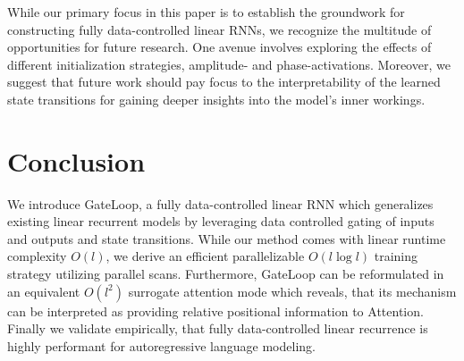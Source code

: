 While our primary focus in this paper is to establish the groundwork for constructing fully data-controlled linear RNNs, we recognize the multitude of opportunities for future research. One avenue involves exploring the effects of different initialization strategies, amplitude- and phase-activations. Moreover, we suggest that future work should pay focus to the interpretability of the learned state transitions for gaining deeper insights into the model's inner workings.

\section{Conclusion}

We introduce GateLoop, a fully data-controlled linear RNN which generalizes existing linear recurrent models by leveraging data controlled gating of inputs and outputs and state transitions. While our method comes with linear runtime complexity $O(l)$,  we derive an efficient parallelizable $O(l \log l)$ training strategy utilizing parallel scans. Furthermore, GateLoop can be reformulated in an equivalent $O(l^2)$ surrogate attention mode which reveals, that its mechanism can be interpreted as providing relative positional information to Attention. Finally we validate empirically, that fully data-controlled linear recurrence is highly performant for autoregressive language modeling.  


